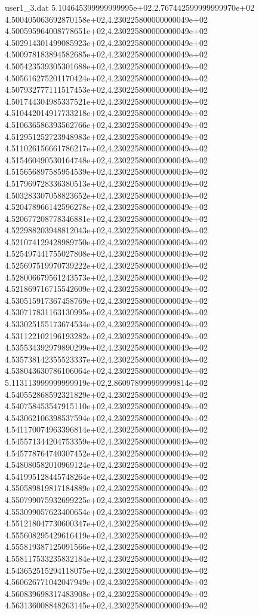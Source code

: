 \begin{filecontents}{user1_3.dat}
5.104645399999999995e+02,2.767442599999999970e+02
4.500405063692870158e+02,4.230225800000000049e+02
4.500595964008778651e+02,4.230225800000000049e+02
4.502914301499085923e+02,4.230225800000000049e+02
4.500978183894582685e+02,4.230225800000000049e+02
4.505423539305301688e+02,4.230225800000000049e+02
4.505616275201170424e+02,4.230225800000000049e+02
4.507932777111517453e+02,4.230225800000000049e+02
4.501744304985337521e+02,4.230225800000000049e+02
4.510442014917733218e+02,4.230225800000000049e+02
4.510636586393562766e+02,4.230225800000000049e+02
4.512951252723948983e+02,4.230225800000000049e+02
4.511026156661786217e+02,4.230225800000000049e+02
4.515460490530164748e+02,4.230225800000000049e+02
4.515656897585954539e+02,4.230225800000000049e+02
4.517969728336380513e+02,4.230225800000000049e+02
4.503283307058823652e+02,4.230225800000000049e+02
4.520478966142596278e+02,4.230225800000000049e+02
4.520677208778346881e+02,4.230225800000000049e+02
4.522988203948812043e+02,4.230225800000000049e+02
4.521074129428989750e+02,4.230225800000000049e+02
4.525497441755027808e+02,4.230225800000000049e+02
4.525697519970739222e+02,4.230225800000000049e+02
4.528006679561243573e+02,4.230225800000000049e+02
4.521869716715542609e+02,4.230225800000000049e+02
4.530515917367458769e+02,4.230225800000000049e+02
4.530717831163130995e+02,4.230225800000000049e+02
4.533025155173674534e+02,4.230225800000000049e+02
4.531122102196193282e+02,4.230225800000000049e+02
4.535534392979890299e+02,4.230225800000000049e+02
4.535738142355523337e+02,4.230225800000000049e+02
4.538043630786106064e+02,4.230225800000000049e+02
5.113113999999999919e+02,2.860978999999999814e+02
4.540552868592321829e+02,4.230225800000000049e+02
4.540758453547915110e+02,4.230225800000000049e+02
4.543062106398537594e+02,4.230225800000000049e+02
4.541170074963396814e+02,4.230225800000000049e+02
4.545571344204753359e+02,4.230225800000000049e+02
4.545778764740307452e+02,4.230225800000000049e+02
4.548080582010969124e+02,4.230225800000000049e+02
4.541995128445748264e+02,4.230225800000000049e+02
4.550589819817184889e+02,4.230225800000000049e+02
4.550799075932699225e+02,4.230225800000000049e+02
4.553099057623400654e+02,4.230225800000000049e+02
4.551218047730600347e+02,4.230225800000000049e+02
4.555608295429616419e+02,4.230225800000000049e+02
4.555819387125091566e+02,4.230225800000000049e+02
4.558117533235832184e+02,4.230225800000000049e+02
4.543652515294118075e+02,4.230225800000000049e+02
4.560626771042047949e+02,4.230225800000000049e+02
4.560839698317483908e+02,4.230225800000000049e+02
4.563136008848263145e+02,4.230225800000000049e+02

\end{filecontents}
